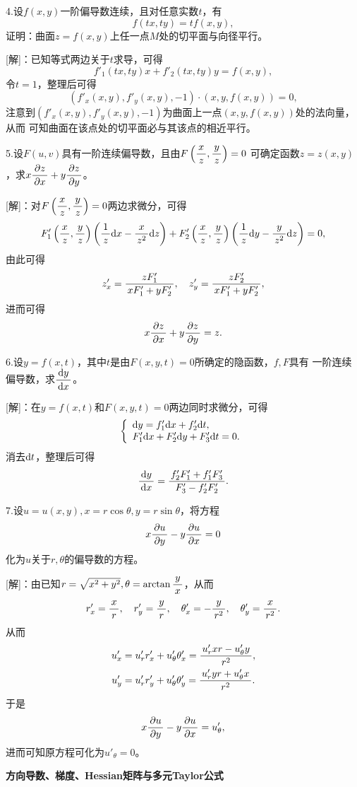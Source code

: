 \bs

4.设$f(x,y)$一阶偏导数连续，且对任意实数$t$，有
$$f(tx,ty)=tf(x,y),$$
证明：曲面$z=f(x,y)$上任一点$M$处的切平面与向径平行。

[解]：已知等式两边关于$t$求导，可得
$$f'_1(tx,ty)x+f'_2(tx,ty)y=f(x,y),$$
令$t=1$，整理后可得
$$(f'_x(x,y),f'_y(x,y),-1)\cdot(x,y,f(x,y))=0,$$
注意到$(f'_x(x,y),f'_y(x,y),-1)$为曲面上一点$(x,y,f(x,y))$处的法向量，从而
可知曲面在该点处的切平面必与其该点的相近平行。\fin

5.设$F(u,v)$具有一阶连续偏导数，且由$F\left(\df xz,\df yz\right)=0$
可确定函数$z=z(x,y)$，求$x\df{\p z}{\p x}+y\df{\p z}{\p y}$。

[解]：对$F\left(\df xz,\df yz\right)=0$两边求微分，可得
$$F'_1\left(\df xz,\df yz\right)\left(\df1z\d x-\df x{z^2}\d z\right)
+F'_2\left(\df xz,\df yz\right)\left(\df1z\d y
-\df{y}{z^2}\d z\right)=0,$$
由此可得
$$
z'_x=\df{zF'_1}{xF'_1+yF'_2},\quad
z'_y=\df{zF'_2}{xF'_1+yF'_2},
$$
进而可得
$$x\df{\p z}{\p x}+y\df{\p z}{\p y}=z.$$
\fin

\bs

6.设$y=f(x,t)$，其中$t$是由$F(x,y,t)=0$所确定的隐函数，$f,F$具有
一阶连续偏导数，求$\df{\d y}{\d x}$。

[解]：在$y=f(x,t)$和$F(x,y,t)=0$两边同时求微分，可得
$$
	\left\{\begin{array}{l}
		\d y=f'_1\d x+f'_2\d t,\\
		F'_1\d x+F'_2\d y+F'_3\d t=0.
	\end{array}\right.
$$
消去$\d t$，整理后可得
$$\df{\d y}{\d x}=\df{f'_2F'_1+f'_1F'_3}{F'_3-f'_2F'_2}.$$
\fin

7.设$u=u(x,y),x=r\cos\theta,y=r\sin\theta$，将方程
$$x\df{\p u}{\p y}-y\df{\p u}{\p x}=0$$
化为$u$关于$r,\theta$的偏导数的方程。

[解]：由已知$r=\sqrt{x^2+y^2},\theta=\arctan\df yx$，从而
$$
	r'_x=\df xr,\quad r'_y= \df yr,\quad
	\theta'_x=-\df y{r^2},\quad \theta'_y=\df x{r^2}. 
$$
从而
\begin{align*}
	u'_x&=u'_rr'_x+u'_{\theta}\theta'_x=\df{u'_rxr-u'_{\theta}y}{r^2},\\
	u'_y&=u'_rr'_y+u'_{\theta}\theta'_y=\df{u'_ryr+u'_{\theta}x}{r^2}.
\end{align*}
于是
$$x\df{\p u}{\p y}-y\df{\p u}{\p x}=u'_{\theta},$$
进而可知原方程可化为$u'_{\theta}=0$。\fin

\bs

\begin{center}
	\bf 方向导数、梯度、Hessian矩阵与多元Taylor公式
\end{center}

